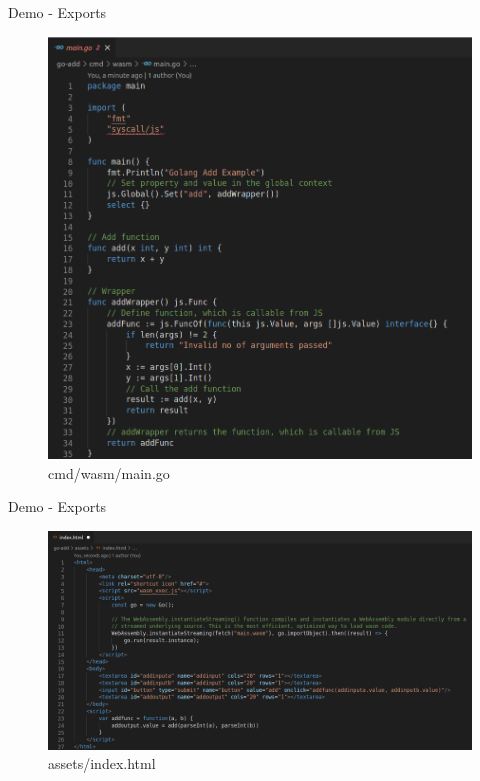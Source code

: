 \documentclass{beamer}
\begin{document}
\begin{frame}{Demo - Exports}
    \begin{figure}
        \includegraphics[scale=0.2]{./images/goaddmain.png}
        \caption{cmd/wasm/main.go}
    \end{figure}
\end{frame}

\begin{frame}{Demo - Exports}
    \begin{figure}
        \includegraphics[scale=0.2]{./images/index.png}
        \caption{assets/index.html}
    \end{figure}
\end{frame}
\end{document}

